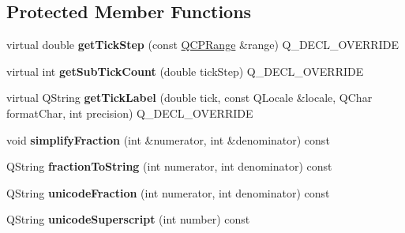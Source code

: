 \subsection*{Protected Member Functions}
\begin{DoxyCompactItemize}
\item 
virtual double {\bfseries get\+Tick\+Step} (const \hyperlink{class_q_c_p_range}{Q\+C\+P\+Range} \&range) Q\+\_\+\+D\+E\+C\+L\+\_\+\+O\+V\+E\+R\+R\+I\+DE\hypertarget{class_q_c_p_axis_ticker_pi_a55301f0072983bd2d7c131a24e1779e7}{}\label{class_q_c_p_axis_ticker_pi_a55301f0072983bd2d7c131a24e1779e7}

\item 
virtual int {\bfseries get\+Sub\+Tick\+Count} (double tick\+Step) Q\+\_\+\+D\+E\+C\+L\+\_\+\+O\+V\+E\+R\+R\+I\+DE\hypertarget{class_q_c_p_axis_ticker_pi_a56c90f870da97c8670cfae4d04ff3ac7}{}\label{class_q_c_p_axis_ticker_pi_a56c90f870da97c8670cfae4d04ff3ac7}

\item 
virtual Q\+String {\bfseries get\+Tick\+Label} (double tick, const Q\+Locale \&locale, Q\+Char format\+Char, int precision) Q\+\_\+\+D\+E\+C\+L\+\_\+\+O\+V\+E\+R\+R\+I\+DE\hypertarget{class_q_c_p_axis_ticker_pi_a9a087d931d4344b8a91d5cecceff7109}{}\label{class_q_c_p_axis_ticker_pi_a9a087d931d4344b8a91d5cecceff7109}

\item 
void {\bfseries simplify\+Fraction} (int \&numerator, int \&denominator) const \hypertarget{class_q_c_p_axis_ticker_pi_a54f04ef1a6d154e0008028b2a00c7442}{}\label{class_q_c_p_axis_ticker_pi_a54f04ef1a6d154e0008028b2a00c7442}

\item 
Q\+String {\bfseries fraction\+To\+String} (int numerator, int denominator) const \hypertarget{class_q_c_p_axis_ticker_pi_ac51d1438d383d802d28c387d6d89e5b4}{}\label{class_q_c_p_axis_ticker_pi_ac51d1438d383d802d28c387d6d89e5b4}

\item 
Q\+String {\bfseries unicode\+Fraction} (int numerator, int denominator) const \hypertarget{class_q_c_p_axis_ticker_pi_a4d9c2f7ba67862646dcbb76956639df7}{}\label{class_q_c_p_axis_ticker_pi_a4d9c2f7ba67862646dcbb76956639df7}

\item 
Q\+String {\bfseries unicode\+Superscript} (int number) const \hypertarget{class_q_c_p_axis_ticker_pi_a32593f7ae19b82ca48e838ae74dfe7a6}{}\label{class_q_c_p_axis_ticker_pi_a32593f7ae19b82ca48e838ae74dfe7a6}


\end{DoxyCompactItemize}
